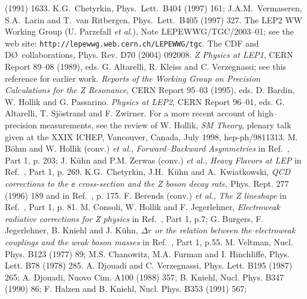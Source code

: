 \begin{thebibliography}{999}
(1991) 1633.
%
 K.G.\ Chetyrkin, Phys.\ Lett.\ B404 (1997) 161; 
J.A.M.\ Vermaseren, S.A.\ Larin and T.\ van Ritbergen, Phys.\ Lett.\ 
B405 (1997) 327.
%
\bibitem{MW-LEP2} The LEP2 WW Working Group (U. Parzefall {\it et al.}), Note 
LEPEWWG/TGC/2003--01; see the web site: 
{\tt  http://lepewwg.web.cern.ch/LEPEWWG/tgc}. 
%
 The CDF and D\O\ collaborations, Phys. Rev. D70 (2004)
092008.
%
\bibitem{Z-Physics} {\it Z Physics at LEP1}, CERN Report 89--08 (1989),
eds. G. Altarelli, R. Kleiss and C. Verzegnassi; see this reference for 
earlier work. 
%
 {\it Reports of the Working Group on Precision
Calculations for the Z Resonance}, CERN Report 95--03 (1995), eds. 
D. Bardin, W. Hollik and G. Passarino.  
%
 {\it Physics at LEP2}, CERN Report 96--01, eds. G. 
Altarelli, T. Sj\"ostrand and F. Zwirner.  
%
 For a more recent account of high--precision 
measurements, see the review of W. Hollik, {\it SM Theory}, plenary talk given 
at the XXIX ICHEP, Vancouver, Canada, July 1998, hep-ph/9811313. 
%
 M. B\"ohm and W. Hollik (conv.) {\it et al.}, {\it 
Forward--Backward Asymmetries} in Ref.~\cite{Z-Physics}, Part 1, p. 203; 
J. K\"uhn and P.M. Zerwas (conv.) {\it et al.}, {\it Heavy Flavors at LEP} in  
Ref.~\cite{Z-Physics}, Part 1, p. 269. 
%
 K.G.~Chetyrkin, J.H.~K\"uhn and A.~Kwiatkowski, 
{\it QCD corrections to the $\ee$ cross-section and the Z boson decay rate}, 
Phys. Rept. 277 (1996) 189 and in Ref.~\cite{Z-Precision}, p. 175.  
%
 F. Berends (conv.) {\it et al.}, {\it The Z lineshape} 
in Ref.~\cite{Z-Physics}, Part 1, p. 81.  
%
 M. Consoli, W. Hollik and F. Jegerlehner, {\it 
Electroweak radiative corrections for Z physics}  in 
Ref.~\cite{Z-Physics}, Part 1, p.7; G. Burgers, F. Jegerlehner,
B. Kniehl and J. K\"uhn, {\it $\Delta r$ or the relation between the 
electroweak couplings and the weak boson masses} in Ref.~\cite{Z-Physics}, 
Part 1, p.55.
% 
 M. Veltman, Nucl. Phys. B123 (1977) 89; 
M.S. Chanowitz, M.A. Furman and I. Hinchliffe, Phys. Lett. B78 (1978) 285.
%
A. Djouadi and C. Verzegnassi, Phys. Lett. B195 (1987) 265; 
A. Djouadi, Nuovo Cim. A100 (1988) 357; 
B. Kniehl, Nucl. Phys. B347 (1990) 86; 
F. Halzen and B. Kniehl, Nucl. Phys. B353 (1991) 567; 

\end{thebibliography}
